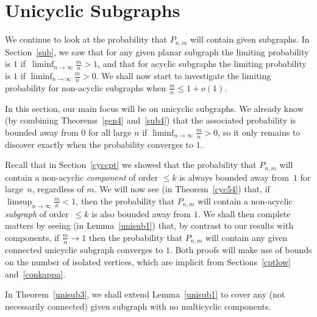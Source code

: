 \documentclass{article}
\newtheorem{Proof of Theorem}{Proof of Theorem}
\begin{document}
\newpage
\section{Unicyclic Subgraphs} \label{cycsub}















We continue to look at the probability that $P_{n,m}$ will contain given subgraphs.
In Section~\ref{sub},
we saw that for any given planar subgraph the limiting probability is $1$ if~$\liminf_{n \to \infty} \frac{m}{n}>1$,
and that for acyclic subgraphs the limiting probability is $1$ if $\liminf_{n \to \infty} \frac{m}{n} >0$.
We shall now start to investigate the limiting probability for non-acyclic subgraphs when $\frac{m}{n} \leq 1+o(1)$.

In this section,
our main focus will be on unicyclic subgraphs.
We already know 
(by combining Theorems~\ref{gen4} and~\ref{sub4})
that the associated probability is bounded away from $0$ for all large $n$
if $\liminf_{n \to \infty} \frac{m}{n} >0$,
so it only remains to discover exactly when the probability converges to $1$.


Recall that in Section~\ref{cyccpt}
we showed that the probability that $P_{n,m}$ will contain a non-acyclic \textit{component} of order $\leq k$ 
is always bounded away from~$1$ for large~$n$, 
regardless of $m$.
We will now see (in Theorem~\ref{cyc54}) that,
if $\limsup_{n \to \infty} \frac{m}{n} <1$,
then the probability that $P_{n,m}$ will contain a non-acyclic \textit{subgraph} of order~$\leq k$
is also bounded away from $1$. 
We shall then complete matters by seeing 
(in Lemma~\ref{unisub1}) that,
by contrast to our results with components,
if $\frac{m}{n} \to 1$ then the probability that $P_{n,m}$ 
will contain any given connected unicyclic subgraph converges to $1$. 
Both proofs will make use of bounds on the number of isolated vertices,
which are implicit from Sections~\ref{cptlow} and~\ref{conkappa}.

In Theorem~\ref{unisub3},
we shall extend Lemma~\ref{unisub1} to cover any (not necessarily connected) given subgraph with no multicyclic components.





\begin{figure}[omitted: a diagram of this paper's results, not reproduced here]\end{figure}
\end{document}
